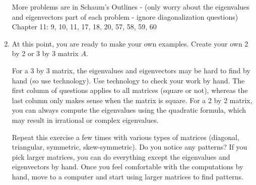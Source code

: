 \begin{enumerate}
More problems are in Schaum's Outlines - 
(only worry about the eigenvalues and eigenvectors part of each problem - ignore diagonalization questions)
Chapter 11: 9, 10, 11, 17, 18, 20, 57, 58, 59, 60



\item At this point, you are ready to make your own examples. Create your own 2 by 2 or 3 by 3 matrix $A$.
\begin{itemize}
\end{itemize}
For a 3 by 3 matrix, the eigenvalues and eigenvectors may be hard to find by hand (so use technology).
Use technology to check your work by hand. The first column of questions applies to all matrices (square or not), whereas the last column only makes sense when the matrix is square. For a 2 by 2 matrix, you can always compute the eigenvalues using the quadratic formula, which may result in irrational or complex eigenvalues. 

Repeat this exercise a few times with various types of matrices (diagonal, triangular, symmetric, skew-symmetric). Do you notice any patterns? If you pick larger matrices, you can do everything except the eigenvalues and eigenvectors by hand. Once you feel comfortable with the computations by hand, move to a computer and start using larger matrices to find patterns. 
 


\end{enumerate}



